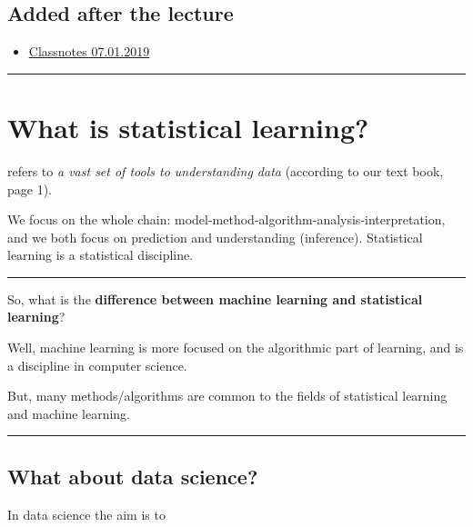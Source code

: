 \documentclass[]{article}
\providecommand{\tightlist}{%
  \setlength{\itemsep}{0pt}\setlength{\parskip}{0pt}}
\begin{document}
\hypertarget{added-after-the-lecture}{%
\subsection{Added after the lecture}\label{added-after-the-lecture}}

\begin{itemize}
\tightlist
\item
  \href{https://www.math.ntnu.no/emner/TMA4268/2019v/notes/M1L1notes.pdf}{Classnotes
  07.01.2019}
\end{itemize}

\begin{center}\rule{0.5\linewidth}{\linethickness}\end{center}

\hypertarget{what-is-statistical-learning}{%
\section{What is statistical
learning?}\label{what-is-statistical-learning}}

refers to \emph{a vast set of tools to understanding data} (according to
our text book, page 1).

We focus on the whole chain:
model-method-algorithm-analysis-interpretation, and we both focus on
prediction and understanding (inference). Statistical learning is a
statistical discipline.

\begin{center}\rule{0.5\linewidth}{\linethickness}\end{center}

So, what is the \textbf{difference between machine learning and
statistical learning}?

Well, machine learning is more focused on the algorithmic part of
learning, and is a discipline in computer science.

But, many methods/algorithms are common to the fields of statistical
learning and machine learning.

\begin{center}\rule{0.5\linewidth}{\linethickness}\end{center}

\hypertarget{what-about-data-science}{%
\subsection{What about data science?}\label{what-about-data-science}}

In data science the aim is to
\end{document}
